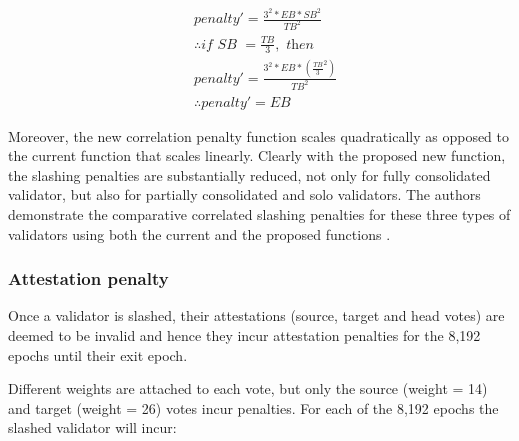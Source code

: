 \documentclass[UTF8]{article}
\begin{document}
\begin{equation*}
\begin{split}
& penalty' = \frac{3^2 * EB * SB^2}{TB^2} \\
& \therefore \textit{if SB } = \frac{TB}{3}, \textit{ then} \\
& penalty' =   \frac{3^2 * EB * \left(  \frac{TB}{3}^2 \right) }{TB^2} \\
& \therefore penalty' = EB
\end{split}
\end{equation*}

Moreover, the new correlation penalty function scales quadratically as opposed to the current function that scales linearly. Clearly with the proposed new function, the slashing penalties are substantially reduced, not only for fully consolidated validator, but also for partially consolidated and solo validators. The authors demonstrate the comparative correlated slashing penalties for these three types of validators using both the current and the proposed functions \cite{Neuder2023d}.

\subsubsection*{Attestation penalty}
Once a validator is slashed, their attestations (source, target and head votes) are deemed to be invalid and hence they incur attestation penalties for the 8,192 epochs until their exit epoch. 

Different weights are attached to each vote, but only the source (weight = 14) and target (weight = 26) votes incur penalties. For each of the 8,192 epochs the slashed validator will incur:
\end{document}
